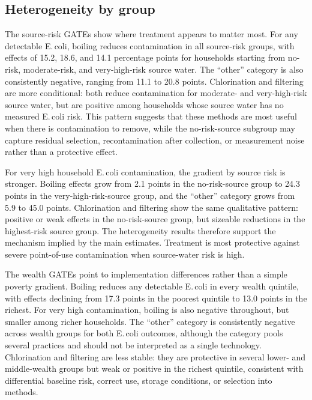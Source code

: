 \documentclass [11pt]{article}
\theoremstyle{plain}
\theoremstyle{definition}
\theoremstyle{remark}
\newcommand{\1}{\bm{1}}
\begin{document}
\subsection{Heterogeneity by group}
The source-risk GATEs show where treatment appears to matter most. For any detectable E.\,coli, boiling reduces contamination in all source-risk groups, with effects of 15.2, 18.6, and 14.1 percentage points for households starting from no-risk, moderate-risk, and very-high-risk source water. The ``other'' category is also consistently negative, ranging from 11.1 to 20.8 points. Chlorination and filtering are more conditional: both reduce contamination for moderate- and very-high-risk source water, but are positive among households whose source water has no measured E.\,coli risk. This pattern suggests that these methods are most useful when there is contamination to remove, while the no-risk-source subgroup may capture residual selection, recontamination after collection, or measurement noise rather than a protective effect.

{\renewcommand\normalsize{\small}\normalsize\singlespacing
}

For very high household E.\,coli contamination, the gradient by source risk is stronger. Boiling effects grow from 2.1 points in the no-risk-source group to 24.3 points in the very-high-risk-source group, and the ``other'' category grows from 5.9 to 45.0 points. Chlorination and filtering show the same qualitative pattern: positive or weak effects in the no-risk-source group, but sizeable reductions in the highest-risk source group. The heterogeneity results therefore support the mechanism implied by the main estimates. Treatment is most protective against severe point-of-use contamination when source-water risk is high.

{\renewcommand\normalsize{\small}\normalsize\singlespacing
}

The wealth GATEs point to implementation differences rather than a simple poverty gradient. Boiling reduces any detectable E.\,coli in every wealth quintile, with effects declining from 17.3 points in the poorest quintile to 13.0 points in the richest. For very high contamination, boiling is also negative throughout, but smaller among richer households. The ``other'' category is consistently negative across wealth groups for both E.\,coli outcomes, although the category pools several practices and should not be interpreted as a single technology. Chlorination and filtering are less stable: they are protective in several lower- and middle-wealth groups but weak or positive in the richest quintile, consistent with differential baseline risk, correct use, storage conditions, or selection into methods.
\end{document}
